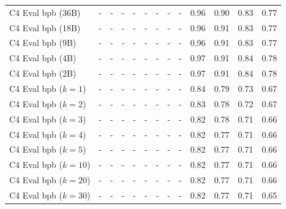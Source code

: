 \documentclass[11pt, a4paper, logo]{deepmind}
\begin{document}
\begin{table}[h]
{\begin{tabular}{l |  c  c  c  c |  c  c  c  c |  c  c  c  c }
        C4 Eval bpb (36B) &
        - & - & - & - &
        - & - & - & - &
        0.96 & 0.90 & 0.83 & 0.77 \\
        
        C4 Eval bpb (18B) &
        - & - & - & - &
        - & - & - & - &
        0.96 & 0.91 & 0.83 & 0.77 \\
        
        C4 Eval bpb (9B) &
        - & - & - & - &
        - & - & - & - &
        0.96 & 0.91 & 0.83 & 0.77 \\
        
        C4 Eval bpb (4B) &
        - & - & - & - &
        - & - & - & - &
        0.97 & 0.91 & 0.84 & 0.78 \\
        
        C4 Eval bpb (2B) &
        - & - & - & - &
        - & - & - & - &
        0.97 & 0.91 & 0.84 & 0.78 \\
        
        \midrule
        C4 Eval bpb ($k={1}$) &
        - & - & - & - &
        - & - & - & - &
        0.84 & 0.79 & 0.73 & 0.67 \\
        
        C4 Eval bpb ($k={2}$) &
        - & - & - & - &
        - & - & - & - &
        0.83 & 0.78 & 0.72 & 0.67 \\
        
        C4 Eval bpb ($k={3}$) &
        - & - & - & - &
        - & - & - & - &
        0.82 & 0.78 & 0.71 & 0.66 \\
        
        C4 Eval bpb ($k={4}$) &
        - & - & - & - &
        - & - & - & - &
        0.82 & 0.77 & 0.71 & 0.66 \\
        
        C4 Eval bpb ($k={5}$) &
        - & - & - & - &
        - & - & - & - &
        0.82 & 0.77 & 0.71 & 0.66 \\
        
        C4 Eval bpb ($k={10}$) &
        - & - & - & - &
        - & - & - & - &
        0.82 & 0.77 & 0.71 & 0.66 \\
        
        C4 Eval bpb ($k={20}$) &
        - & - & - & - &
        - & - & - & - &
        0.82 & 0.77 & 0.71 & 0.66 \\
        
        C4 Eval bpb ($k={30}$) &
        - & - & - & - &
        - & - & - & - &
        0.82 & 0.77 & 0.71 & 0.65 \\
        

\end{tabular}}
\end{table}
\end{document}
